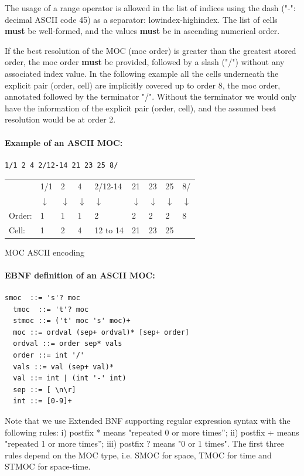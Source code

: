 \documentclass[11pt,a4paper]{ivoa}
\begin{document}
The usage of a range operator is allowed in the list of indices using the
dash ("-": decimal ASCII code 45) as a separator: lowindex-highindex.
The list of cells {\bf must} be well-formed, and the values {\bf must}
be in ascending numerical order.

If the best resolution of the MOC (moc order) is greater than the
greatest stored order, the moc order {\bf must} be provided, followed
by a slash ("/") without any associated index value.
In the following example all the
cells underneath the explicit pair (order, cell) are implicitly covered
up to order 8, the moc order, annotated followed by the terminator "/".
Without the terminator we would only have the information of the explicit
pair (order, cell), and the assumed best resolution would be at order 2.   


\paragraph{Example of an ASCII MOC:}
\begin{lstlisting}[]
    1/1 2 4 2/12-14 21 23 25 8/
\end{lstlisting}

\begin{center}
  {\small
  \begin{tabular} { l l l l l l l l l }
   & 1/1   & 2  & 4  & 2/12-14 & 21 & 23 &  25 & 8/ \\
   & $\downarrow$ & $\downarrow$ & $\downarrow$ & $\downarrow$ & $\downarrow$ & $\downarrow$ & $\downarrow$ & $\downarrow$ \\
Order:     & 1    & 1 & 1 & 2        & 2  &  2 & 2  & 8 \\
Cell:      & 1    & 2 & 4 & 12 to 14 & 21 & 23 & 25 & \\
\end{tabular}}

MOC ASCII encoding
\end{center}


\paragraph{EBNF definition of an ASCII MOC:}
\begin{lstlisting}[]
  smoc  ::= 's'? moc
  tmoc  ::= 't'? moc
  stmoc ::= ('t' moc 's' moc)+
  moc ::= ordval (sep+ ordval)* [sep+ order]
  ordval ::= order sep* vals
  order ::= int '/'
  vals ::= val (sep+ val)*
  val ::= int | (int '-' int)
  sep ::= [ \n\r]
  int ::= [0-9]+
\end{lstlisting}
Note that we use Extended BNF supporting regular expression
syntax with the following rules: i) postfix * means "repeated
0 or more times”; ii) postfix + means "repeated 1 or more
times”; iii) postfix ? means "0 or 1 times". The first three
rules depend on the MOC type, i.e. SMOC for space, TMOC for
time and STMOC for space-time. 
\end{document}
